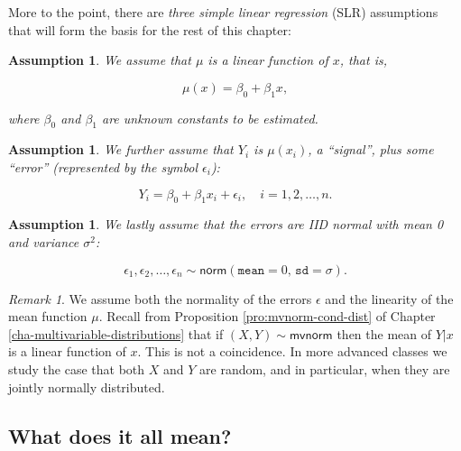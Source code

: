 \documentclass[]{book}
\numberwithin{equation}{chapter}
\numberwithin{figure}{chapter}
\theoremstyle{plain}
\newtheorem{assumption}[thm]{Assumption}
\theoremstyle{definition}
\theoremstyle{remark}
\newtheorem{rem}[thm]{Remark}
\theoremstyle{definition}
\theoremstyle{definition}
\theoremstyle{remark}
\begin{document}
More to the point, there are \emph{three simple linear regression} (SLR)
assumptions  that will form the basis for
the rest of this chapter:

\bigskip

\begin{assumption}
We assume that \(\mu\) is a linear function of \(x\), that is,

\begin{equation}
\mu(x)=\beta_{0}+\beta_{1}x,
\end{equation}

where \(\beta_{0}\) and \(\beta_{1}\) are unknown constants to be
estimated. \bigskip
\end{assumption}\begin{assumption}
We further assume that \(Y_{i}\) is \(\mu(x_{i})\), a ``signal'', plus
some ``error'' (represented by the symbol \(\epsilon_{i}\)):

\begin{equation}
Y_{i} = \beta_{0} + \beta_{1}x_{i} + \epsilon_{i}, \quad i = 1,2,\ldots,n.
\end{equation}
\end{assumption}

\bigskip

\begin{assumption}
We lastly assume that the errors are IID normal with mean 0 and variance
\(\sigma^{2}\):

\begin{equation}
\epsilon_{1},\epsilon_{2},\ldots,\epsilon_{n}\sim\mathsf{norm}(\mathtt{mean}=0,\,\mathtt{sd}=\sigma).
\end{equation}
\end{assumption}

\bigskip

\begin{rem}
We assume both the normality of the errors \(\epsilon\) and the
linearity of the mean function \(\mu\). Recall from Proposition
\ref{pro:mvnorm-cond-dist} of Chapter
\ref{cha-multivariable-distributions} that if
\((X,Y) \sim \mathsf{mvnorm}\) then the mean of \(Y|x\) is a linear
function of \(x\). This is not a coincidence. In more advanced classes
we study the case that both \(X\) and \(Y\) are random, and in
particular, when they are jointly normally distributed.
\end{rem}

\subsection{What does it all mean?}\label{what-does-it-all-mean}
\end{document}
